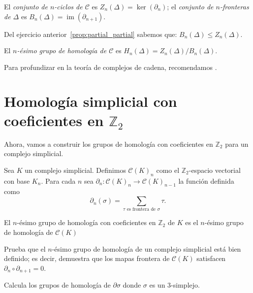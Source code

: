\documentclass{standalone}
\begin{document}
	\begin{definition}\label{defn:z_cycles_boundary}
		El \emph{conjunto de $n$-ciclos de $\mathcal{C}$} es $Z_{n}(\Delta)=\ker(\partial_{n})$; el \emph{conjunto de $n$-fronteras de $\Delta$} es $B_{n}(\Delta)=\operatorname{im}(\partial_{n+1})$.
	\end{definition}
	
	Del ejercicio anterior~\ref{prop:partial_partial} sabemos que: $B_{n}(\Delta)\leq Z_{n}(\Delta)$.
	\begin{definition}\label{defn:z_simplicial_homology}
		El \emph{$n$-ésimo grupo de homología de $\mathcal{C}$} es $H_{n}(\Delta)=Z_{n}(\Delta)/B_{n}(\Delta)$.
	\end{definition}
	Para profundizar en la teoría de complejos de cadena, recomendamos \cite{rotman:1988:algebraic:topology}.
	\section{Homología simplicial con coeficientes en $\mathbb{Z}_{2}$}
	Ahora, vamos a construir los grupos de homología con coeficientes en $\mathbb{Z}_{2}$ para un complejo simplicial.
	
	Sea $K$ un complejo simplicial. Definimos $\mathcal{C}(K)_{n}$ como el $\mathbb{Z}_{2}$-espacio vectorial con base $K_{n}$. Para cada $n$ sea $\partial_{n}\colon\mathcal{C}(K)_{n}\rightarrow\mathcal{C}(K)_{n-1}$ la función definida como 
	\[
	\partial_{n}(\sigma)=\sum_{\tau\text{ es frontera de }\sigma}\tau.
	\]
	
	\begin{definition}
		El $n$-ésimo grupo de homología con coeficientes en $\mathbb{Z}_{2}$ de $K$ es el $n$-ésimo grupo de homología de $\mathcal{C}(K)$
	\end{definition}
	
	\begin{exercise}
		Prueba que el $n$-ésimo grupo de homología de un complejo simplicial está bien definido; es decir, demuestra que los mapas frontera de $\mathcal{C}(K)$ satisfacen $\partial_{n}\circ\partial_{n+1}=0$.
	\end{exercise}
	
	\begin{exercise}
		Calcula los grupos de homología de $\partial\sigma$ donde $\sigma$ es un $3$-simplejo.
	\end{exercise}
\end{document}
